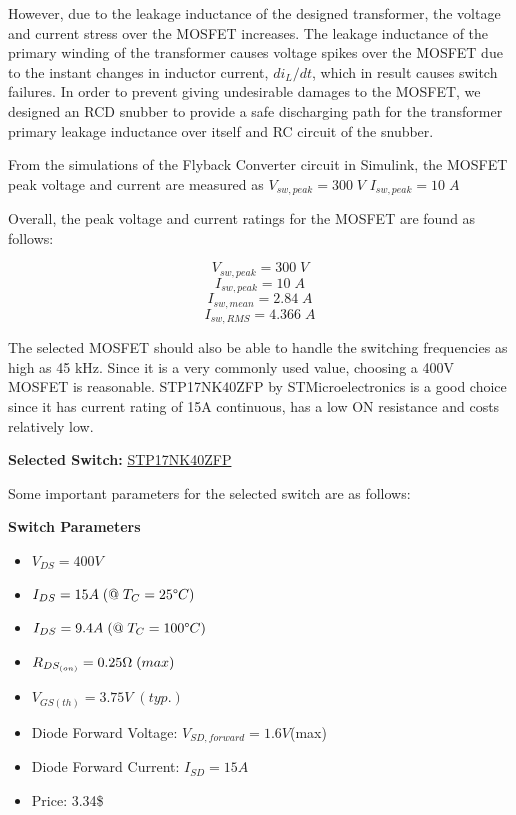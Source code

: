 However, due to the leakage inductance of the designed transformer, the voltage and current stress over the MOSFET increases. The leakage inductance of the primary winding of the transformer causes voltage spikes over the MOSFET due to the instant changes in inductor current, $di_L/dt$, which in result causes switch failures. In order to prevent giving undesirable damages to the MOSFET, we designed an RCD snubber to provide a safe discharging path for the transformer primary leakage inductance over itself and RC circuit of the snubber. 

From the simulations of the Flyback Converter circuit in Simulink, the MOSFET peak voltage and current are measured as $ V_{sw,peak} = 300\;V $ $ I_{sw,peak} = 10\;A $

Overall, the peak voltage and current ratings for the MOSFET are found as follows:

$$ V_{sw,peak} = 300\;V $$
$$ I_{sw,peak} = 10\;A $$
$$ I_{sw,mean} = 2.84\;A $$
$$ I_{sw,RMS} = 4.366\;A $$

The selected MOSFET should also be able to handle the switching frequencies as high as 45 kHz. 
Since it is a very commonly used value, choosing a 400V MOSFET is reasonable. STP17NK40ZFP by STMicroelectronics is a good choice since it has current rating of 15A continuous, has a low ON resistance and costs relatively low.

\textbf{Selected Switch: } \href{https://pdf1.alldatasheet.com/datasheet-pdf/view/24337/STMICROELECTRONICS/STP17NK40ZFP.html}{STP17NK40ZFP}

Some important parameters for the selected switch are as follows:

\textbf{Switch Parameters}

\begin{itemize}
    \item $V_{DS} = 400V$
    \item $I_{DS} = 15A\;(@\; T_C = 25\degree C)$
    \item $I_{DS} = 9.4A\;(@\; T_C = 100\degree C)$
    \item $R_{DS_{(on)}} = 0.25\ohm\;(max)$
    \item $V_{GS(th)} = 3.75V\;(typ.)$
    \item Diode Forward Voltage: $V_{SD,forward} = 1.6V$\;(max)
    \item Diode Forward Current: $I_{SD} = 15A$
    \item Price: 3.34\$
\end{itemize}

